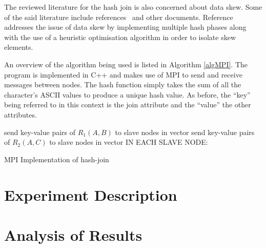 \documentclass[journal,draftclsnofoot,11pt]{IEEEtran}
\begin{document}
The reviewed literature for the hash join is also concerned about data skew. Some of the said literature include references~\cite{Wolf1990,Keller1991} and other documents. Reference~\cite{Wolf1990} addresses the issue of data skew by implementing multiple hash phases along with the use of a heuristic optimisation algorithm in order to isolate skew elements\cite{Wolf1990}.

An overview of the algorithm being used is listed in Algorithm \ref{algMPI}. The program is implemented in C++ and makes use of MPI to send and receive messages between nodes. The hash function simply takes the sum of all the character's ASCII values to produce a unique hash value. As before, the ``key'' being referred to in this context is the join attribute and the ``value'' the other attributes.
\begin{algorithm}
send key-value pairs of $R_{1}(A,B)$ to slave nodes in vector\;
send key-value pairs of $R_{2}(A,C)$ to slave nodes in vector\;
IN EACH SLAVE NODE:\\
 \caption{MPI Implementation of hash-join}
\label{algMPI}
\end{algorithm}
\section{Experiment Description}\label{desc}

\section{Analysis of Results}\label{ana}
\end{document}
